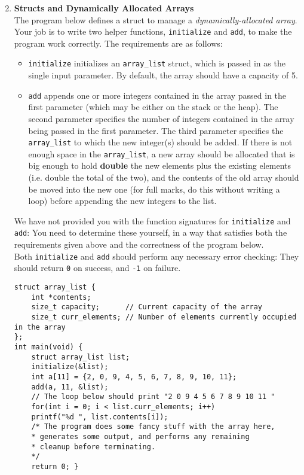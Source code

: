 \documentclass[11pt]{article}
\begin{document}
\newpage
\begin{enumerate}
	\setcounter{enumi}{1}
	\item \textbf{Structs and Dynamically Allocated Arrays}\\
		The program below defines a struct to manage a \textit{dynamically-allocated array}. Your job is to write two helper functions, \Verb|initialize| and \Verb|add|, to make the program work correctly. The requirements are as follows:
			\begin{itemize}
				\item \Verb|initialize| initializes an \Verb|array_list| struct, which is passed in as the single input parameter. By default, the array should have a capacity of 5.
				\item \Verb|add| appends one or more integers contained in the array passed in the first parameter (which may be either on the stack or the heap). The second parameter specifies the number of integers contained in the array being passed in the first parameter. The third parameter specifies the \Verb|array_list| to which the new integer(s) should be added. If there is not enough space in the \Verb|array_list|, a new array should be allocated that is big enough to hold \textbf{double} the new elements plus the existing elements (i.e. double the total of the two), and the contents of the old array should be moved into the new one (for full marks, do this without writing a loop) before appending the new integers to the list.
			\end{itemize}
		We have not provided you with the function signatures for \Verb|initialize| and \Verb|add|: You need to determine these yourself, in a way that satisfies both the requirements given above and the correctness of the program below.\\
		Both \Verb|initialize| and \Verb|add| should perform any necessary error checking: They should return \Verb|0| on success, and \Verb|-1| on failure.
		\begin{Verbatim}
struct array_list {
	int *contents;
	size_t capacity;      // Current capacity of the array
	size_t curr_elements; // Number of elements currently occupied in the array
};
int main(void) {
	struct array_list list;
	initialize(&list);
	int a[11] = {2, 0, 9, 4, 5, 6, 7, 8, 9, 10, 11};
	add(a, 11, &list);
	// The loop below should print "2 0 9 4 5 6 7 8 9 10 11 "
	for(int i = 0; i < list.curr_elements; i++)
	printf("%d ", list.contents[i]);
	/* The program does some fancy stuff with the array here,
	* generates some output, and performs any remaining
	* cleanup before terminating.
	*/
	return 0; }
		\end{Verbatim}
	\newpage
		


\end{enumerate}
\end{document}
